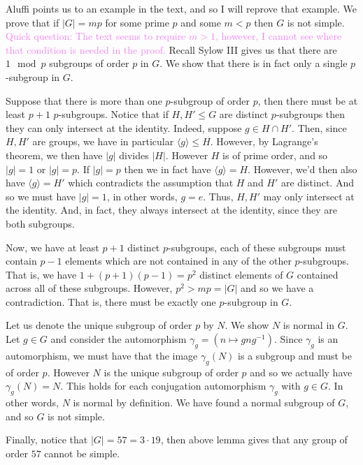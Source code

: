 \documentclass[12pt,letterpaper,boxed]{hmcpset}
\newcommand{\wg}[1]{\textcolor{violet}{#1}}
\newcommand{\abs}[1]{\left|#1\right|}
\newcommand{\inv}{^{-1}}
\newcommand{\anglee}[1]{\langle #1 \rangle}
\begin{document}
\begin{solution}
Aluffi points us to an example in the text, and so I will reprove that
example. We prove that if $\abs{G} = mp$ for some prime $p$ and some
$m < p$ then $G$ is not simple. \wg{Quick question: The text seems to require $m > 1$,
however, I cannot see where that condition is needed in the proof.}
Recall Sylow III gives us that there are $1\mod p$ subgroups of order
$p$ in $G$. We show that there is in fact only a single $p$-subgroup
in $G$.

Suppose that there is more than one $p$-subgroup of order
$p$, then there must be at least $p+1$ $p$-subgroups.
Notice that if $H,H' \leq G$ are distinct $p$-subgroups then they can
only intersect at the identity. Indeed, suppose $g \in H \cap H'$.
Then, since $H,H'$ are groups, we have in particular $\anglee g \leq
H$. However, by Lagrange's theorem, we then have $\abs{g}$ divides $\abs
H$. However $H$ is of prime order, and so $\abs{g} = 1$ or $\abs g =
p$. If $\abs g = p$ then we in fact have $\anglee g = H$. However, 
we'd then also have $\anglee g = H'$ which contradicts the assumption that
$H$ and $H'$ are distinct. And so we must have $\abs g = 1$, in other
words, $g = e$. Thus, $H,H'$ may only intersect at the identity. And,
in fact, they always intersect at the identity, since they are both
subgroups.

Now, we have at least $p+1$ distinct $p$-subgroups, each of these
subgroups must contain $p-1$ elements which are not contained in any
of the other $p$-subgroups. That is, we have $1 + (p+1)(p-1) = p^2$
distinct elements of $G$ contained across all of these subgroups. However, $p^2 > mp =
\abs G$ and so we have a contradiction. That is, there must be exactly
one $p$-subgroup in $G$.

Let us denote the unique subgroup of order $p$ by $N$.
We show $N$ is normal in $G$. Let $g \in
G$ and consider the automorphism $\gamma_g = (n \mapsto
g n g\inv)$. Since $\gamma_g$ is an automorphism, we must have that
the image $\gamma_g(N)$ is a subgroup and must be of order $p$. 
However $N$ is the unique subgroup of order $p$ and so we actually have $\gamma_g(N) =
N$. This holds for each conjugation automorphism $\gamma_g$ with $g
\in G$. In other words, $N$ is normal by definition. We have found a
normal subgroup of $G$, and so $G$ is not simple.

Finally, notice that $\abs G = 57 = 3 \cdot 19$, then above lemma
gives that any group of order $57$ cannot be simple.
\end{solution}
\end{document}
